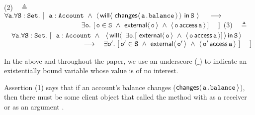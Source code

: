 \vspace{.4cm}

    (2)\ \  $\triangleq$\ \ $\forall \prg{a}.\forall \prg{S}:\prg{Set}.\ [  \ \  \prg{a}:\prg{Account}\ \wedge \  \Using{ \Future{\,\Changes{\prg{a.balance}}} \,}{\prg{S}\,}\ \ \   \
    \longrightarrow$ \\
 $\strut \hspace{3.9cm} \hfill \exists \prg{o}.\ [\, \prg{o}\in \prg{S}\ \wedge\  \External{\prg{o}}  \ \wedge \ \CanAccess{\prg{o}}{\prg{a}} \, ] \ \ \ \ ]$
\vspace{.4cm} 
     (3)\ \  $\triangleq$\ \ $\forall \prg{a}.\forall \prg{S}:\prg{Set}.\ [ \ \  \prg{a}:\prg{Account}\ \wedge \ \ {\Using{\Future{\ \exists \prg{o}.[\ \External{\prg{o}} \ \wedge\ \CanAccess{\prg{o}}{\prg{a}}]}}{\SF}}$ \\  
 $\strut \hspace{3.9cm} \hfill   \longrightarrow \ \ \ \exists \prg{o}'.\ [\, \prg{o}'\in \prg{S}\  \wedge  \ \External{\prg{o}'}  \ \wedge \ \CanAccess{\prg{o}'}{\prg{a}}   \ ] \ \ \ \ ]$
\vspace{.2cm}

\noindent 
In the above and throughout the paper, we use an underscore ($\_$) to indicate an existentially bound variable whose 
value is of no interest.

\vspace{.2cm}

Assertion (1) %
says that if   an account's balance changes
(${\mathsf{changes}}\langle\,{\mbox{\tt{a.balance}}}\,\rangle$),
then there must be some client object 
that %
called the  method with  as a receiver or as an argument 
.
 
